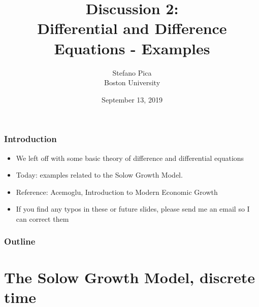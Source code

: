 \documentclass[11pt]{beamer}
\begin{document}
\title{Discussion 2: \\ Differential and Difference Equations - Examples}
\author{Stefano Pica \\ Boston University}
\date{September 13, 2019}


\begin{frame}
\titlepage
\end{frame}


\begin{frame}
\frametitle{Introduction}
\begin{itemize}\itemsep2ex
	\item We left off with some basic theory of difference and differential equations
	\item Today: examples related to the Solow Growth Model.
	\item Reference: Acemoglu, Introduction to Modern Economic Growth
	\item If you find any typos in these or future slides, please send me an email so I can correct them
\end{itemize}
\end{frame}


\begin{frame}
\frametitle{Outline}
\tableofcontents
\end{frame}


\section{The Solow Growth Model, discrete time}

\end{document}

